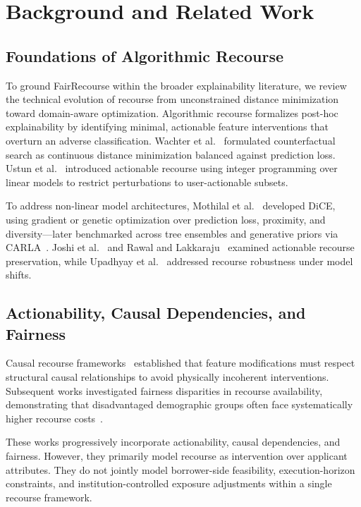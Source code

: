\documentclass[manuscript,screen,review,anonymous]{acmart}
\begin{document}
\section{Background and Related Work}

\subsection{Foundations of Algorithmic Recourse}
To ground FairRecourse within the broader explainability literature, we review the technical evolution of recourse from unconstrained distance minimization toward domain-aware optimization. Algorithmic recourse formalizes post-hoc explainability by identifying minimal, actionable feature interventions that overturn an adverse classification. Wachter et al.~\cite{wachter2017counterfactual} formulated counterfactual search as continuous distance minimization balanced against prediction loss. Ustun et al.~\cite{ustun2019actionable} introduced actionable recourse using integer programming over linear models to restrict perturbations to user-actionable subsets.

To address non-linear model architectures, Mothilal et al.~\cite{mothilal2020dice} developed DiCE, using gradient or genetic optimization over prediction loss, proximity, and diversity---later benchmarked across tree ensembles and generative priors via CARLA~\cite{pawelczyk2021carla}. Joshi et al.~\cite{joshi2019towards} and Rawal and Lakkaraju~\cite{rawal2020individually} examined actionable recourse preservation, while Upadhyay et al.~\cite{upadhyay2021robust} addressed recourse robustness under model shifts.

\subsection{Actionability, Causal Dependencies, and Fairness}
Causal recourse frameworks~\cite{karimi2021causal,mahajan2019preserving} established that feature modifications must respect structural causal relationships to avoid physically incoherent interventions. Subsequent works investigated fairness disparities in recourse availability, demonstrating that disadvantaged demographic groups often face systematically higher recourse costs~\cite{vonkugelgen2022fairness,gupta2019equalizing,sharma2020certkai,barocas2020hidden,venkatasubramanian2020philosophical}.

These works progressively incorporate actionability, causal dependencies, and fairness. However, they primarily model recourse as intervention over applicant attributes. They do not jointly model borrower-side feasibility, execution-horizon constraints, and institution-controlled exposure adjustments within a single recourse framework.
\end{document}
